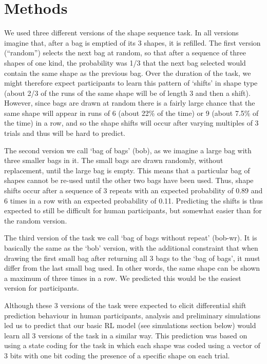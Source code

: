 \documentclass[10pt,letterpaper]{article}
\begin{document}
\section{Methods}

We used three different versions of the shape sequence task. In all versions imagine that, after a bag is emptied of its 3 shapes, it is refilled. The first version (“random”) selects the next bag at random, so that after a sequence of three shapes of one kind, the probability was 1/3 that the next bag selected would contain the same shape as the previous bag. Over the duration of the task, we might therefore expect participants to learn this pattern of  ‘shifts’ in shape type (about 2/3 of the runs of the same shape will be of length 3 and then a shift). However, since bags are drawn at random there is a fairly large chance that the same shape will appear in runs of 6 (about 22\% of the time) or 9 (about 7.5\% of the time) in a row, and so the shape shifts will occur after varying multiples of 3 trials and thus will be hard to predict.

The second version we call ‘bag of bags’ (bob), as we imagine a large bag with three smaller bags in it. The small bags are drawn randomly, without replacement, until the large bag is empty. This means that a particular bag of shapes cannot be re-used until the other two bags have been used. Thus, shape shifts occur after a sequence of 3 repeats with an expected probability of 0.89 and 6 times in a row with an expected probability of 0.11. Predicting the shifts is thus expected to still be difficult for human participants, but somewhat easier than for the random version.

The third version of the task we call ‘bag of bags without repeat’ (bob-wr). It is basically the same as the ‘bob’ version, with the additional constraint that when drawing the first small bag after returning all 3 bags to the ‘bag of bags’, it must differ from the last small bag used. In other words, the same shape can be shown a maximum of three times in a row. We predicted this would be the easiest version for participants.

Although these 3 versions of the task were expected to elicit differential shift prediction behaviour in human participants, analysis and preliminary simulations led us to predict that our basic RL model (see simulations section below) would learn all 3 versions of the task in a similar way. This prediction was based on using a state coding for the task in which each shape was coded using a vector of 3 bits with one bit coding the presence of a specific shape on each trial.
\end{document}
